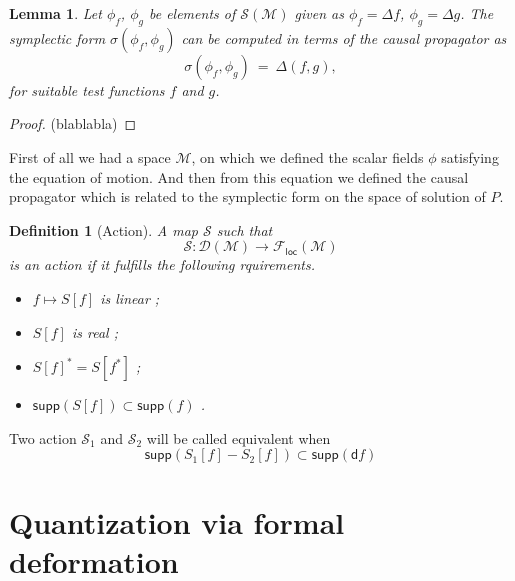 \documentclass[10pt]{book}
\newcommand{\supp}{\mathsf{supp}}
\newcommand{\Dcal}{\mathcal{D}}
\newcommand{\Fcal}{\mathcal{F}}
\newcommand{\Mcal}{\mathcal{M}}
\newcommand{\Scal}{\mathcal{S}}
\newcommand{\dsf}{\mathsf{d}}
\theoremstyle{break}
\newtheorem{lemma}{Lemma}
\newtheorem{definition}{Definition}
\begin{document}
\begin{lemma} %
 Let $\phi_f$, $\phi_g$ be elements of $\mathcal{S}(\Mcal)$ given as $\phi_f = \Delta f$, $\phi_g = \Delta g$. The symplectic form $\sigma(\phi_f, \phi_g)$ can be computed in terms of the causal propagator as
 \begin{equation}
  \sigma(\phi_f, \phi_g) \ = \ \mathsf{\Delta}(f,g), 
 \end{equation}
 for suitable test functions $f$ and $g$. 
\end{lemma}

\begin{proof}
 (blablabla)
\end{proof}

First of all we had a space $\Mcal$, on which we defined the scalar fields $\phi$ satisfying the equation of motion. And then from this equation we defined the causal propagator which is related to the symplectic form on the space of solution of $P$.



\newpage

\begin{definition}[Action]
A map $\Scal$ such that
%
\begin{equation*}
\Scal : \Dcal(\Mcal) \to \Fcal_{\mathsf{loc}}(\Mcal) 
\end{equation*}
%
is an action if it fulfills the following rquirements.
%
\begin{itemize}
\item $f \mapsto S[f]$ is linear ;
\item $S[f]$ is real ;
\item $S[f]^\ast = S[f^\ast]$ ;
\item $\supp\left( S[f] \right) \subset \supp\left( f \right)$ .
\end{itemize}
%
\end{definition}

Two action $\Scal_1$ and $\Scal_2$ will be called equivalent when
%
\begin{equation*}
\supp\left( S_1[f] - S_2[f] \right) \subset \supp\left( \dsf f \right) 
\end{equation*}




\section{Quantization via formal deformation}
\end{document}
